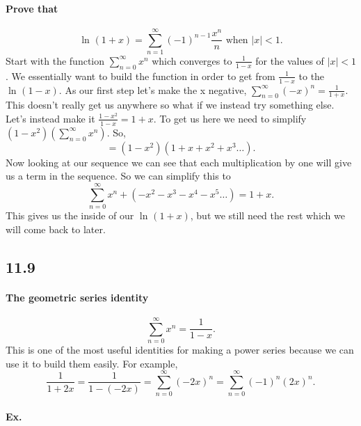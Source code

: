 \paragraph{Prove that}
\[
\ln^{  } \left( 1+x \right) = \sum_{ n=1 } ^{ \infty } \left( -1 \right) ^{ n-1 }\frac{ x^{ n } }{ n } \text{ when } \left| x \right|<1
.\] 
Start with the function $ \sum_{ n=0 } ^{ \infty } x^{ n } $ which converges to $ \frac{ 1 }{ 1-x }  $ for the values of $ \left| x \right|< 1 $. We essentially want to build the function in order to get from $ \frac{ 1 }{ 1-x }  $ to the $ \ln^{  } \left( 1-x \right)  $. As our first step let's make the x negative,  $ \sum_{ n=0 } ^{ \infty } \left( -x \right) ^{ n } =\frac{ 1 }{ 1+x }  $. This doesn't really get us anywhere so what if we instead try something else. \\
Let's instead make it $ \frac{ 1-x^2 }{ 1-x }= 1+x $. To get us here we need to simplify $ \left( 1-x^2 \right) \left( \sum_{ n=0 } ^{ \infty } x^{ n } \right)  $. So,
\[
=\left( 1-x^2 \right) \left( 1+x+x^2+x^3\ldots \right) 
.\] 
Now looking at our sequence we can see that each multiplication by one will give us a term in the sequence. So we can simplify this to 
\[
\sum_{ n=0 } ^{ \infty } x^{ n }+\left( -x^2-x^3-x^{ 4 }-x^{ 5 }\ldots \right) = 1+x
.\] 
This gives us the inside of our $ \ln^{  } \left( 1+x \right)  $, but we still need the rest which we will come back to later. 

\subsection*{11.9}%
\label{sub:11.9}
\paragraph{The geometric series identity}
\[
\sum_{ n=0 } ^{ \infty } x^{ n }= \frac{ 1 }{ 1-x } 
.\] 
This is one of the most useful identities for making a power series because we can use it to build them easily. For example,
\[
\frac{ 1 }{ 1+2x } =\frac{ 1 }{ 1-\left( -2x \right)  } = \sum_{ n=0 } ^{ \infty } \left( -2x \right) ^{ n } = \sum_{ n=0 } ^{ \infty } \left( -1 \right) ^{ n }\left( 2x \right) ^{ n }
.\] 
\paragraph{Ex.}
